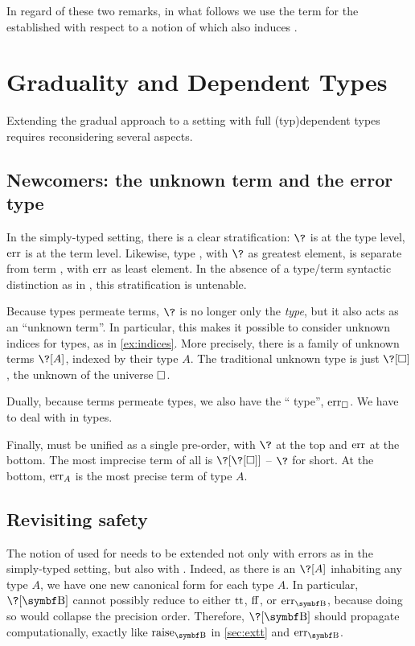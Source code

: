 In regard of these two remarks, in what follows we use the term 
for the  established with respect to a notion of  which also
induces .

\section{Graduality and Dependent Types}
\label{sec:graduality}

Extending the gradual approach to a setting with full \kl(typ){dependent} types
requires reconsidering several aspects.

\subsection{Newcomers: the unknown term and the error type}
%
In the simply-typed setting, there is a clear stratification: $\?$ is at the type level,
$\err$ is at the term level. Likewise, type , with $\?$ as greatest element,
is separate from term , with $\err$ as least element.
In the absence of a type/term syntactic distinction as in ,
this stratification is untenable.

Because types permeate terms, $\?$ is no longer only the  \emph{type},
but it also acts as an “unknown term”.
In particular, this makes it possible to consider unknown indices for types,
as in \cref{ex:indices}.
More precisely, there is a family of unknown terms $\?[A]$, indexed by their type $A$.
The traditional unknown type is just $\?[\uni]$, the unknown of the universe $\uni$.

Dually, because terms permeate types, we also have the “ type”, $\err[\uni]$.
We have to deal with  in types.

Finally,  must be unified as a single pre-order, with $\?$ at the top
and $\err$ at the bottom.
The most imprecise term of all%
is $\?[\?[\uni]]$ – $\?$ for short. At the bottom, $\err[A]$
is the most precise term of type $A$.

\subsection{Revisiting safety}

The notion of  used for  needs to be extended not
only with errors as in the simply-typed setting, but also with .
Indeed, as there is an  $\?[A]$ inhabiting any type
$A$, we have one new canonical form for each type $A$. In particular,
$\?[\Bool]$ cannot possibly reduce to either $\operatorname{tt}$, $\operatorname{ff}$, or $\err[\Bool]$,
because doing so would collapse the precision order.
%
Therefore, $\?[\Bool]$ should propagate computationally, exactly
like $\rai[\Bool]$ in \cref{sec:extt} and $\err[\Bool]$.
%

